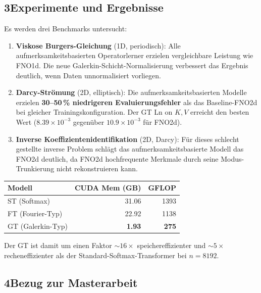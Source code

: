 \documentclass[a4paper,12pt]{article}
\begin{document}
\subsection*{3\quad Experimente und Ergebnisse}

Es werden drei Benchmarks untersucht:
\begin{enumerate}
    \item \textbf{Viskose Burgers-Gleichung} (1D, periodisch): Alle aufmerksamkeitsbasierten
    Operatorlerner erzielen vergleichbare Leistung wie FNO1d. Die neue Galerkin-Schicht-Normalisierung
    verbessert das Ergebnis deutlich, wenn Daten unnormalisiert vorliegen.

    \item \textbf{Darcy-Strömung} (2D, elliptisch): Die aufmerksamkeitsbasierten Modelle
    erzielen \textbf{30--50\,\% niedrigeren Evaluierungsfehler} als das Baseline-FNO2d bei
    gleicher Trainingskonfiguration. Der GT Ln on $K,V$ erreicht den besten Wert ($8.39 \times 10^{-3}$
    gegenüber $10.9 \times 10^{-3}$ für FNO2d).

    \item \textbf{Inverse Koeffizientenidentifikation} (2D, Darcy): Für dieses schlecht
    gestellte inverse Problem schlägt das aufmerksamkeitsbasierte Modell das FNO2d deutlich,
    da FNO2d hochfrequente Merkmale durch seine Modus-Trunkierung nicht rekonstruieren kann.
\end{enumerate}

\begin{center}
\begin{tabular}{lrr}
\toprule
\textbf{Modell} & \textbf{CUDA Mem (GB)} & \textbf{GFLOP} \\
\midrule
ST (Softmax) & 31.06 & 1393 \\
FT (Fourier-Typ) & 22.92 & 1138 \\
GT (Galerkin-Typ) & \textbf{1.93} & \textbf{275} \\
\bottomrule
\end{tabular}
\end{center}

Der GT ist damit um einen Faktor $\sim 16\times$ speichereffizienter und $\sim 5\times$
recheneffizienter als der Standard-Softmax-Transformer bei $n = 8192$.

\subsection*{4\quad Bezug zur Masterarbeit}
\end{document}
